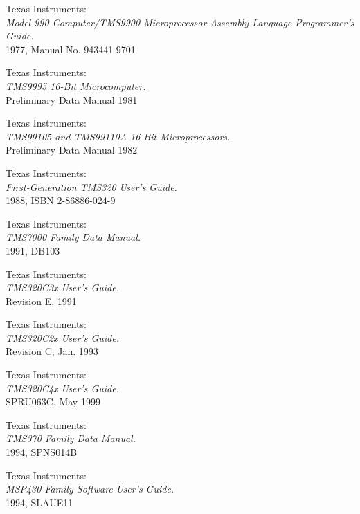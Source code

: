   Texas Instruments: \\
                 {\em Model 990 Computer/TMS9900 Microprocessor
                      Assembly Language Programmer's Guide.\/} \\
                 1977, Manual No. 943441-9701

 Texas Instruments: \\
                 {\em TMS9995 16-Bit Microcomputer.\/} \\
                 Preliminary Data Manual
                 1981

 Texas Instruments: \\
                 {\em TMS99105 and TMS99110A 16-Bit Microprocessors.\/} \\
                 Preliminary Data Manual
                 1982

 Texas Instruments: \\
                {\em First-Generation TMS320 User's Guide.\/} \\
                1988, ISBN 2-86886-024-9

 Texas Instruments: \\
                 {\em TMS7000 Family Data Manual.\/} \\
                 1991, DB103

 Texas Instruments: \\
                {\em TMS320C3x User's Guide.\/} \\
                Revision E, 1991

 Texas Instruments: \\
                {\em TMS320C2x User's Guide.\/} \\
                Revision C, Jan. 1993

 Texas Instruments: \\
                   {\em TMS320C4x User's Guide.\/} \\
                   SPRU063C, May 1999

 Texas Instruments: \\
                {\em TMS370 Family Data Manual.\/} \\
                1994, SPNS014B

 Texas Instruments: \\
                       {\em MSP430 Family Software User's Guide.\/} \\
                       1994, SLAUE11

